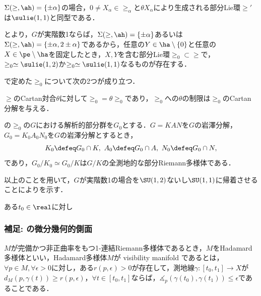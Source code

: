 \begin{lem}\label{lem:su11}
  
  $\Sigma(\ge,\ah) = \{\pm\alpha\}$の場合，$0\neq X_{\alpha}\in \ge_{\alpha}$と$\theta X_{\alpha}$により生成される部分Lie環$\ge'$は$\sulie(1,1)$と同型である．
\end{lem}

\begin{cor}\label{cor:sub-lie-alg}
  とより，$G$が実階数1ならば，$\Sigma(\ge,\ah) = \{\pm\alpha\} $あるいは$\Sigma(\ge,\ah)  = \{\pm\alpha, 2\pm\alpha \} $であるから，任意の$Y\in \ha\setminus\{0\} $と任意の$X\in \pe\setminus \ha$を固定したとき，$X,Y$を含む部分Lie環$\ge_0\subset \ge$で，$\ge_0\simeq \sulie(1,2) $か$\ge_0\simeq \sulie(1,1)$なるものが存在する．
\end{cor}

で定めた$\ge_0$について次の2つが成り立つ．
\begin{lem}\cite[p.~409, Lemma~2.2]{hel01}
  $\ge$のCartan対合$\theta$に対して$\ge_0 = \theta\ge_0$であり，$\ge_0 $への$\theta$の制限は$\ge_0$のCartan分解を与える．
\end{lem}


\begin{lem}\cite[p.~409, Lemma~2.3]{hel01}

  の$\ge_0$の$G$における解析的部分群を$G_0$とする．$G = KAN$を$G$の岩澤分解，$G_0 = K_0A_0N_0$を$G$の岩澤分解とするとき，
  \begin{align*}
    K_0\defeq G_0\cap K,\ A_0 \defeq G_0\cap A,\ N_0\defeq G_0\cap N, 
  \end{align*}
  であり，$G_0/K_0 \simeq G_0/K$は$G/K$の全測地的な部分Riemann多様体である．
  
\end{lem}

以上のことを用いて，$G$が実階数1の場合を$\SU(1,2) $ないし$\SU(1,1) $に帰着させることによりを示す．

\begin{pfwn}{}

  ある$t_0 \in \real$に対し
  
\end{pfwn}


\subsubsection{補足: の微分幾何的側面}
\begin{defi}{\cite[Definition~1.3]{e72-1}}\label{def:visibility}

  $M$が完備かつ非正曲率をもつ1-連結Riemann多様体であるとき，$M$をHadamard多様体といい，Hadamard多様体$M$が visibility manifold であるとは，$\forall p\in M, \forall \epsilon > 0$に対し，ある$r(p,\epsilon) >0 $が存在して，測地線$\gamma\colon [t_0, t_1]\to X $が$d_{M}(p, \gamma(t))\geq r(p,\epsilon) $，$\forall t\in [t_0, t_1]$ならば，$\measuredangle_{p}(\gamma(t_0), \gamma(t_1)) \leq \epsilon $であることである．
\end{defi}

